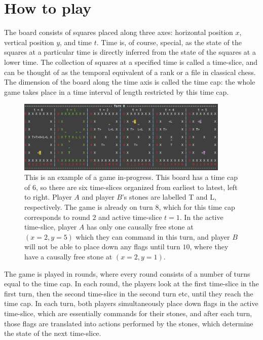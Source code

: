 \documentclass[12pt]{article}
\begin{document}
	\section{How to play}
	The board consists of squares placed along three axes: horizontal position $x$, vertical position $y$, and time $t$. Time is, of course, special, as the state of the squares at a particular time is directly inferred from the state of the squares at a lower time. The collection of squares at a specified time is called a time-slice, and can be thought of as the temporal equivalent of a rank or a file in classical chess. The dimension of the board along the time axis is called the time cap: the whole game takes place in a time interval of length restricted by this time cap.
	
	\begin{figure}[h]
\begin{center}

    \includegraphics[width=0.9\textwidth]{images/diag_game_example}
 \caption{This is an example of a game in-progress. This board has a time cap of $6$, so there are six time-slices organized from earliest to latest, left to right. Player $A$ and player $B$'s stones are labelled T and L, respectively. The game is already on turn $8$, which for this time cap corresponds to round $2$ and active time-slice $t=1$. In the active time-slice, player $A$ has only one causally free stone at $(x=2, y=5)$ which they can command in this turn, and player $B$ will not be able to place down any flags until turn $10$, where they have a causally free stone at $(x=2, y=1)$.}\label{fig:game example}
\end{center}
\end{figure}
	
	The game is played in rounds, where every round consists of a number of turns equal to the time cap. In each round, the players look at the first time-slice in the first turn, then the second time-slice in the second turn etc, until they reach the time cap. In each turn, both players simultaneously place down flags in the active time-slice, which are essentially commands for their stones, and after each turn, those flags are translated into actions performed by the stones, which determine the state of the next time-slice.
	
\end{document}
